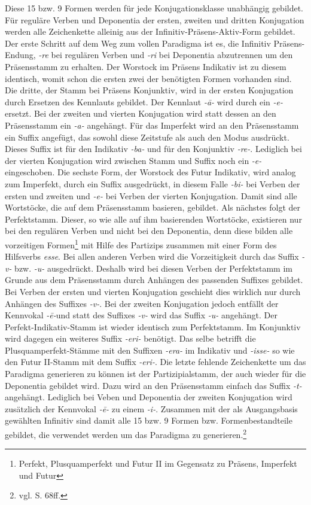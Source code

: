 \documentclass[fontsize=12pt,abstract=on,titlepage,bibliography=totoc,ngerman,listof=totoc]{scrreprt}
\begin{document}
Diese 15 bzw. 9 Formen werden für jede Konjugationsklasse unabhängig gebildet. Für reguläre Verben und Deponentia der ersten, zweiten und dritten Konjugation werden alle Zeichenkette alleinig aus der Infinitiv-Präsens-Aktiv-Form gebildet. Der erste Schritt auf dem Weg zum vollen Paradigma ist es, die Infinitiv Präsens-Endung, \textit{-re} bei regulären Verben und \textit{-ri} bei Deponentia abzutrennen um den Präsensstamm zu erhalten. Der Worstock im Präsens Indikativ ist zu diesem identisch, womit schon die ersten zwei der benötigten Formen vorhanden sind. Die dritte, der Stamm bei Präsens Konjunktiv, wird in der ersten Konjugation durch Ersetzen des Kennlauts gebildet. Der Kennlaut \textit{-ā-} wird durch ein \textit{-e-} ersetzt. Bei der zweiten und vierten Konjugation wird statt dessen an den Präsensstamm ein \textit{-a-} angehängt. Für das Imperfekt wird an den Präsensstamm ein Suffix angefügt, das sowohl diese Zeitstufe als auch den Modus ausdrückt. Dieses Suffix ist für den Indikativ \textit{-ba-} und für den Konjunktiv \textit{-re-}. Lediglich bei der vierten Konjugation wird zwischen Stamm und Suffix noch ein \textit{-e-} eingeschoben. Die sechste Form, der Worstock des Futur Indikativ, wird analog zum Imperfekt, durch ein Suffix ausgedrückt, in diesem Falle \textit{-bi-} bei Verben der ersten und zweiten und \textit{-e-} bei Verben der vierten Konjugation. Damit sind alle Wortstöcke, die auf dem Präsensstamm basieren, gebildet. Als nächstes folgt der Perfektstamm. Dieser, so wie alle auf ihm basierenden Wortstöcke, existieren nur bei den regulären Verben und nicht bei den Deponentia, denn diese bilden alle vorzeitigen Formen\footnote{Perfekt, Plusquamperfekt und Futur II im Gegensatz zu Präsens, Imperfekt und Futur} mit Hilfe des Partizips zusammen mit einer Form des Hilfsverbs \textit{esse}. Bei allen anderen Verben wird die Vorzeitigkeit durch das Suffix \textit{-v-} bzw. \textit{-u-} ausgedrückt. Deshalb wird bei diesen Verben der Perfektstamm im Grunde aus dem Präsensstamm durch Anhängen des passenden Suffixes gebildet. Bei Verben der ersten und vierten Konjugation geschieht dies wirklich nur durch Anhängen des Suffixes \textit{-v-}. Bei der zweiten Konjugation jedoch entfällt der Kennvokal \textit{-ē-}und statt des Suffixes \textit{-v-} wird das Suffix \textit{-u-} angehängt. Der Perfekt-Indikativ-Stamm ist wieder identisch zum Perfektstamm. Im Konjunktiv wird dagegen ein weiteres Suffix \textit{-eri-} benötigt. Das selbe betrifft die Plusquamperfekt-Stämme mit den Suffixen \textit{-era-} im Indikativ und \textit{-isse-} so wie den Futur II-Stamm mit dem Suffix \textit{-eri-}. Die letzte fehlende Zeichenkette um das Paradigma generieren zu können ist der Partizipialstamm, der auch wieder für die Deponentia gebildet wird. Dazu wird an den Präsensstamm einfach das Suffix \textit{-t-} angehängt. Lediglich bei Veben und Deponentia der zweiten Konjugation wird zusätzlich der Kennvokal \textit{-ē-} zu einem \textit{-i-}. Zusammen mit der als Ausgangsbasis gewählten Infinitiv sind damit alle 15 bzw. 9 Formen bzw. Formenbestandteile gebildet, die verwendet werden um das Paradigma zu generieren.\footnote{vgl. \cite{BAYER-LINDAUER1994} S. 68ff.} \par
\end{document}
